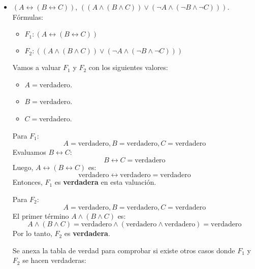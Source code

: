 \begin{solution}
    \begin{itemize}
        \item $(A \leftrightarrow (B \leftrightarrow C))$, $((A \land (B \land C)) \lor (\neg A \land (\neg B \land \neg C)))$. 
        Fórmulas:
        \begin{itemize}
            \item $F_1: (A \leftrightarrow (B \leftrightarrow C))$
            \item $F_2: ((A \land (B \land C)) \lor (\neg A \land (\neg B \land \neg C)))$
        \end{itemize}   

        Vamos a valuar $F_1$ y $F_2$ con los siguientes valores:
        \begin{itemize}
            \item $A = \text{verdadero}$.
            \item $B = \text{verdadero}$. 
            \item $C = \text{verdadero}$.
        \end{itemize}

        Para $F_1$:
        \[
        A = \text{verdadero}, B = \text{verdadero}, C = \text{verdadero}
        \]
        Evaluamos \( B \leftrightarrow C \):
        \[
        B \leftrightarrow C = \text{verdadero}
        \]
        Luego, \( A \leftrightarrow (B \leftrightarrow C) \) es:
        \[
        \text{verdadero} \leftrightarrow \text{verdadero} = \text{verdadero}
        \]
        Entonces, \( F_1 \) es \textbf{verdadera} en esta valuación.
    
        Para $F_2$:
        \[
        A = \text{verdadero}, B = \text{verdadero}, C = \text{verdadero}
        \]
        El primer término \( A \land (B \land C) \) es:
        \[
        A \land (B \land C) = \text{verdadero} \land (\text{verdadero} \land \text{verdadero}) = \text{verdadero}
        \]
        Por lo tanto, \( F_2 \) es \textbf{verdadera}.

        Se anexa la tabla de verdad para comprobar si existe otros casos donde $F_1$ y $F_2$ se hacen verdaderas:


\end{itemize}
\end{solution}
